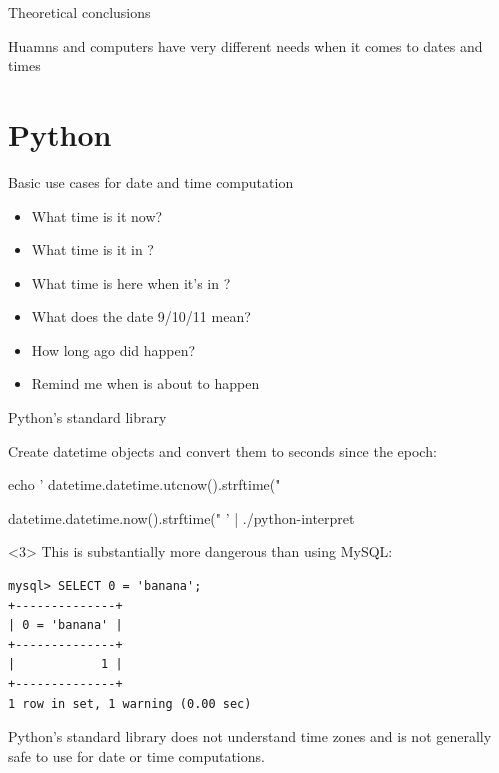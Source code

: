 \documentclass[xcolor=svgnames,17pt]{beamer}
\newcommand*{\sizefont}[1]{%
    \ifcase#1\relax
    \or \tiny
    \or \scriptsize
    \or \footnotesize
    \or \small
    \or \normalsize
    \or \large
    \or \Large
    \or \LARGE
    \or \huge
    \or \Huge
    \fi}
\begin{document}
\begin{frame}{Theoretical conclusions}

Huamns and computers have very different needs when it comes to dates and
times

\end{frame}

\section{Python}

\begin{frame}{Basic use cases for date and time computation}
\begin{itemize}
\item What time is it now?
\item What time is it in \fillinblank?
\item What time is here when it’s \fillinblank in \fillinblank?
\item What does the date 9/10/11 mean?
\item How long ago did \fillinblank happen?
\item Remind me when \fillinblank is about to happen
\end{itemize}
\end{frame}

\begin{frame}
\tableofcontents[currentsection]
\end{frame}

\begin{frame}[fragile]{Python's standard library}

Create datetime objects and convert them to seconds since the epoch:

\pause

{\sizefont{3}
\bash[stdout]
echo '
datetime.datetime.utcnow().strftime("%


datetime.datetime.now().strftime("%
' | ./python-interpret
\END
}

\pause

\begin{onlyenv}<3>
This is substantially more dangerous than using MySQL:

\sizefont{2}
\begin{verbatim}
mysql> SELECT 0 = 'banana';
+--------------+
| 0 = 'banana' |
+--------------+
|            1 |
+--------------+
1 row in set, 1 warning (0.00 sec)
\end{verbatim}
\end{onlyenv}

\pause

\alert{Python’s standard library does not understand time zones and is not
generally safe to use for date or time computations.}

\end{frame}
\end{document}
